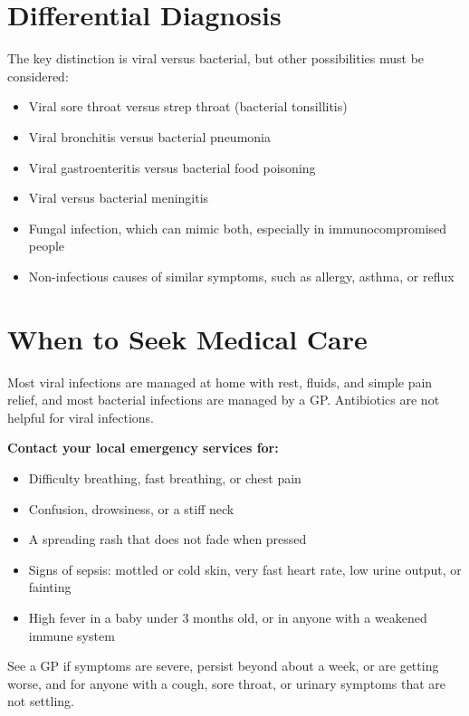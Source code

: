 \section*{Differential Diagnosis}
The key distinction is viral versus bacterial, but other possibilities must be considered:

\begin{itemize}
    \item Viral sore throat versus strep throat (bacterial tonsillitis)
    \item Viral bronchitis versus bacterial pneumonia
    \item Viral gastroenteritis versus bacterial food poisoning
    \item Viral versus bacterial meningitis
    \item Fungal infection, which can mimic both, especially in immunocompromised people
    \item Non-infectious causes of similar symptoms, such as allergy, asthma, or reflux
\end{itemize}

\section*{When to Seek Medical Care}
Most viral infections are managed at home with rest, fluids, and simple pain relief, and most bacterial infections are managed by a GP. Antibiotics are not helpful for viral infections.

\textbf{Contact your local emergency services for:}
\begin{itemize}
    \item Difficulty breathing, fast breathing, or chest pain
    \item Confusion, drowsiness, or a stiff neck
    \item A spreading rash that does not fade when pressed
    \item Signs of sepsis: mottled or cold skin, very fast heart rate, low urine output, or fainting
    \item High fever in a baby under 3 months old, or in anyone with a weakened immune system
\end{itemize}

See a GP if symptoms are severe, persist beyond about a week, or are getting worse, and for anyone with a cough, sore throat, or urinary symptoms that are not settling.

